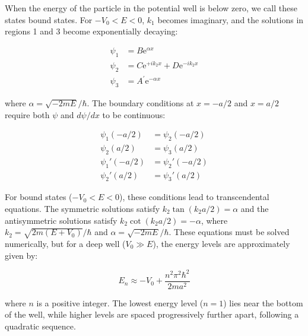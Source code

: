 \documentclass[
  a4paper,
]{book}
\begin{document}
When the energy of the particle in the potential well is below zero, we
call these states bound states. For \(-V_0 < E < 0\), \(k_1\) becomes
imaginary, and the solutions in regions 1 and 3 become exponentially
decaying:

\[
\begin{aligned}
\psi_1 & =  B \mathrm{e}^{\alpha x}\\
\psi_2 & =  C \mathrm{e}^{+i k_2 x} + D \mathrm{e}^{-i k_2 x}\\
\psi_3 & =  A^{\prime} \mathrm{e}^{-\alpha x}
\end{aligned}
\]

where \(\alpha = \sqrt{-2mE}/\hbar\). The boundary conditions at
\(x = -a/2\) and \(x = a/2\) require both \(\psi\) and \(d\psi/dx\) to
be continuous:

\[
\begin{aligned}
\psi_1(-a/2) & = \psi_2(-a/2)\\
\psi_2(a/2) & = \psi_3(a/2)\\
\psi_1'(-a/2) & = \psi_2'(-a/2)\\
\psi_2'(a/2) & = \psi_3'(a/2)
\end{aligned}
\]

For bound states (\(-V_0 < E < 0\)), these conditions lead to
transcendental equations. The symmetric solutions satisfy
\(k_2\tan(k_2a/2) = \alpha\) and the antisymmetric solutions satisfy
\(k_2\cot(k_2a/2) = -\alpha\), where \(k_2 = \sqrt{2m(E+V_0)}/\hbar\)
and \(\alpha = \sqrt{-2mE}/\hbar\). These equations must be solved
numerically, but for a deep well (\(V_0 \gg E\)), the energy levels are
approximately given by:

\[E_n \approx -V_0 + \frac{n^2\pi^2\hbar^2}{2ma^2}\]

where \(n\) is a positive integer. The lowest energy level (\(n=1\))
lies near the bottom of the well, while higher levels are spaced
progressively further apart, following a quadratic sequence.
\end{document}
